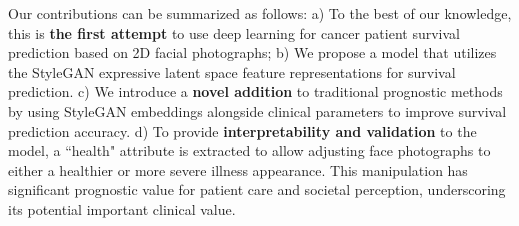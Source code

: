 \documentclass[runningheads]{llncs}
\begin{document}
Our contributions can be summarized as follows: a) To the best of our knowledge, this is \textbf{the first attempt} to use deep learning for cancer patient survival prediction based on 2D facial photographs;
b) We propose a model that utilizes the StyleGAN expressive latent space feature representations for survival prediction.
c) We introduce a \textbf{novel addition} to traditional prognostic methods by using StyleGAN embeddings alongside clinical parameters to improve survival prediction accuracy.
d) To provide \textbf{interpretability and validation} to the model, a ``health" attribute is extracted to allow adjusting face photographs to either a healthier or more severe illness appearance. This manipulation has significant prognostic value for patient care and societal perception, underscoring its potential important clinical value.%

\end{document}
